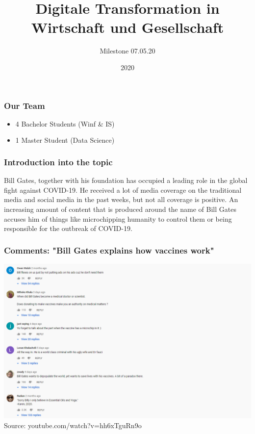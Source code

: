 \documentclass{beamer}
\title{Digitale Transformation in Wirtschaft und Gesellschaft}
\author{Milestone 07.05.20}
\institute{University of Bamberg/ University Konstanz}
\date{2020}
\begin{document}
\frame{\titlepage}

\begin{frame}
\frametitle{Our Team}

\begin{itemize}
	\item 4 Bachelor Students (Winf \& IS) 
	\item 1 Master Student  (Data Science)
\end{itemize}




\end{frame}


\begin{frame}
\frametitle{Introduction into the topic}
 Bill Gates, together with his foundation has occupied a leading role in the global fight against COVID-19. He received a lot of media coverage on the traditional media and social media in the past weeks, but not all coverage is positive. An increasing amount of content that is produced around the name of Bill Gates accuses him of things like microchipping humanity to control them or being responsible for the outbreak of COVID-19.
\end{frame}	

\begin{frame}
\frametitle{Comments: "Bill Gates explains how vaccines work"}
\includegraphics[height=0.7\textheight]{BillGatesvaccines}
Source: youtube.com/watch?v=hh6xTguRn9o
\end{frame}	
\end{document}

